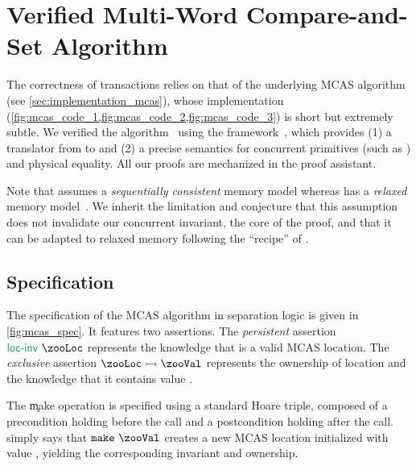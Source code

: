 \section{Verified Multi-Word Compare-and-Set Algorithm}
\label{sec:verification}

The correctness of \Kcas transactions relies on that of the underlying MCAS algorithm (see \cref{sec:implementation_mcas}), whose implementation (\cref{fig:mcas_code_1,fig:mcas_code_2,fig:mcas_code_3}) is short but extremely subtle.
We verified the algorithm~ using the \Zoo framework~\citep{DBLP:journals/pacmpl/AllainS26}, which provides (1) a translator from \OCaml to \Rocq and (2) a precise semantics for concurrent primitives (such as ) and physical equality.
All our proofs are mechanized in the \Rocq proof assistant.

Note that \Zoo assumes a \emph{sequentially consistent} memory model whereas \OCamlFive has a \emph{relaxed} memory model~\citep{DBLP:conf/pldi/DolanSM18}.
We inherit the limitation and conjecture that this assumption does not invalidate our concurrent invariant, the core of the proof, and that it can be adapted to relaxed memory following the ``recipe'' of \citet{DBLP:journals/pacmpl/MevelJ21}.

\subsection{Specification}



The specification of the MCAS algorithm in separation logic is given in \cref{fig:mcas_spec}.
It features two assertions.
The \emph{persistent} assertion $\locInv\ \zooLoc$ represents the knowledge that \zooLoc is a valid MCAS location.
The \emph{exclusive} assertion $\zooLoc \iPointstoTwo \zooVal$ represents the ownership of location \zooLoc and the knowledge that it contains value \zooVal.

The \c{make} operation is specified using a standard Hoare triple, composed of a precondition holding before the call and a postcondition holding after the call.
 simply says that $\c{make}\ \zooVal$ creates a new MCAS location initialized with value \zooVal, yielding the corresponding invariant and ownership.

